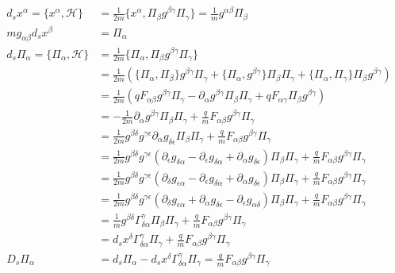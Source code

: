 \documentclass[11pt]{article}
\begin{document}
\begin{equation}
\begin{aligned}
d_s x^\alpha = \{x^\alpha, \mathcal{H}\} &= \frac{1}{2m} \{x^\alpha, \Pi_\beta g^{\beta\gamma} \Pi_\gamma\} = \frac{1}{m} g^{\alpha \beta} \Pi_\beta \\
m g_{\alpha\beta} d_s x^\beta &= \Pi_\alpha \\
d_s \Pi_\alpha = \{ \Pi_\alpha , \mathcal{H} \} &= \frac{1}{2m} \{\Pi_\alpha, \Pi_\beta g^{\beta\gamma} \Pi_\gamma\} \\
&= \frac{1}{2m} \left( \{\Pi_\alpha, \Pi_\beta\}  g^{\beta\gamma} \Pi_\gamma + \{\Pi_\alpha,  g^{\beta\gamma} \} \Pi_\beta \Pi_\gamma + \{\Pi_\alpha,  \Pi_\gamma\} \Pi_\beta g^{\beta\gamma} \right)  \\
&= \frac{1}{2m} \left( q F_{\alpha \beta}  g^{\beta\gamma} \Pi_\gamma - \partial_\alpha g^{\beta\gamma} \Pi_\beta \Pi_\gamma + q F_{\alpha \gamma} \Pi_\beta g^{\beta\gamma} \right)  \\
&= - \frac{1}{2m} \partial_\alpha g^{\beta\gamma} \Pi_\beta \Pi_\gamma + \frac{q}{m} F_{\alpha\beta} g^{\beta\gamma} \Pi_\gamma \\
&= \frac{1}{2m} g^{\beta\delta} g^{\gamma\epsilon} \partial_\alpha g_{\delta\epsilon} \Pi_\beta \Pi_\gamma + \frac{q}{m} F_{\alpha\beta} g^{\beta\gamma} \Pi_\gamma \\
&= \frac{1}{2m} g^{\beta\delta} g^{\gamma\epsilon}(\partial_\epsilon g_{\delta\alpha} - \partial_\epsilon g_{\delta\alpha} + \partial_\alpha g_{\delta\epsilon} ) \Pi_\beta \Pi_\gamma + \frac{q}{m} F_{\alpha\beta} g^{\beta\gamma} \Pi_\gamma \\
&= \frac{1}{2m} g^{\beta\delta} g^{\gamma\epsilon}(\partial_\delta g_{\epsilon\alpha} - \partial_\epsilon g_{\delta\alpha} + \partial_\alpha g_{\delta\epsilon} ) \Pi_\beta \Pi_\gamma + \frac{q}{m} F_{\alpha\beta} g^{\beta\gamma} \Pi_\gamma \\
&= \frac{1}{2m} g^{\beta\delta} g^{\gamma\epsilon}(\partial_\delta g_{\epsilon\alpha} + \partial_\alpha g_{\delta\epsilon} - \partial_\epsilon g_{\alpha\delta}  ) \Pi_\beta \Pi_\gamma + \frac{q}{m} F_{\alpha\beta} g^{\beta\gamma} \Pi_\gamma \\
&= \frac{1}{m} g^{\beta\delta} \Gamma^\gamma_{\delta\alpha} \Pi_\beta \Pi_\gamma + \frac{q}{m} F_{\alpha\beta} g^{\beta\gamma} \Pi_\gamma \\
&= d_sx^\delta \Gamma^\gamma_{\delta\alpha} \Pi_\gamma + \frac{q}{m} F_{\alpha\beta} g^{\beta\gamma} \Pi_\gamma \\
D_s \Pi_\alpha &= d_s \Pi_\alpha - d_sx^\delta \Gamma^\gamma_{\delta\alpha} \Pi_\gamma = \frac{q}{m} F_{\alpha\beta} g^{\beta\gamma} \Pi_\gamma \\
\end{aligned}
\end{equation}
\end{document}
